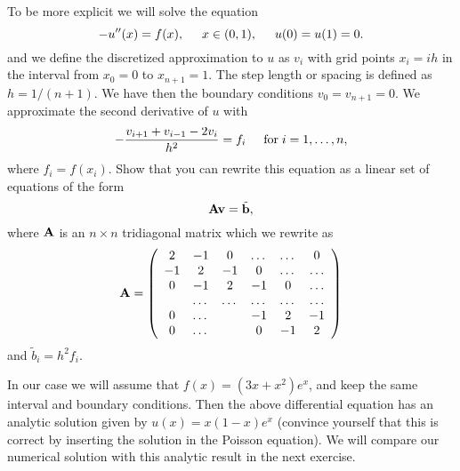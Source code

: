 \documentclass[11pt,a4wide]{article}
\begin{document}
\begin{enumerate}
To be more explicit we will solve the equation
\[
-u''(x) = f(x), \hspace{0.5cm} x\in(0,1), \hspace{0.5cm} u(0) = u(1) = 0.
\]
and we define the discretized approximation  to $u$ as $v_i$  with 
grid points $x_i=ih$   in the interval from $x_0=0$ to $x_{n+1}=1$.
The step length or spacing is defined as $h=1/(n+1)$. 
We have then the boundary conditions $v_0 = v_{n+1} = 0$.
We  approximate the second
derivative of $u$ with 
\[
   -\frac{v_{i+1}+v_{i-1}-2v_i}{h^2} = f_i  \hspace{0.5cm} \mathrm{for} \hspace{0.1cm} i=1,\dots, n,
\]
where $f_i=f(x_i)$.
Show that you can rewrite this equation as a linear set of equations of the form 
\[
   {\bf A}{\bf v} = \tilde{{\bf b}},
\]
where ${\bf A}$ is an $n\times n$  tridiagonal matrix which we rewrite as 
\begin{equation}
    {\bf A} = \left(\begin{array}{cccccc}
                           2& -1& 0 &\dots   & \dots &0 \\
                           -1 & 2 & -1 &0 &\dots &\dots \\
                           0&-1 &2 & -1 & 0 & \dots \\
                           & \dots   & \dots &\dots   &\dots & \dots \\
                           0&\dots   &  &-1 &2& -1 \\
                           0&\dots    &  & 0  &-1 & 2 \\
                      \end{array} \right)
\end{equation}
and $\tilde{b}_i=h^2f_i$.


In our case we will assume  that $f(x) = (3x+x^2)e^x$, and keep the same interval and boundary 
conditions. Then the above differential equation
has an analytic solution given by $u(x) = x(1-x)e^x$ (convince yourself that this is correct by inserting the
solution in the Poisson equation).  We will compare
our numerical solution with this analytic result in the next exercise. 


\end{enumerate}
\end{document}
